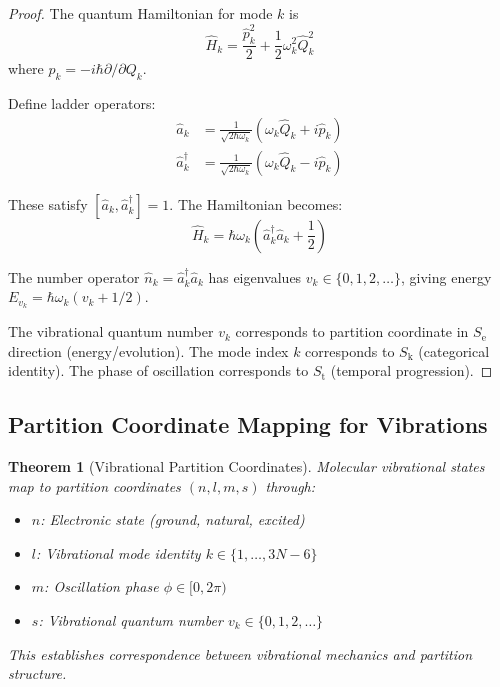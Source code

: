 \documentclass[twocolumn,10pt]{article}
\newtheorem{theorem}{Theorem}[section]
\newcommand{\Sk}{S_{\text{k}}}
\newcommand{\St}{S_{\text{t}}}
\newcommand{\Se}{S_{\text{e}}}
\begin{document}
\begin{proof}
The quantum Hamiltonian for mode $k$ is
\begin{equation}
\hat{H}_k = \frac{\hat{p}_k^2}{2} + \frac{1}{2}\omega_k^2 \hat{Q}_k^2
\end{equation}
where $\hat{p}_k = -i\hbar \partial/\partial Q_k$.

Define ladder operators:
\begin{align}
\hat{a}_k &= \frac{1}{\sqrt{2\hbar\omega_k}}(\omega_k \hat{Q}_k + i\hat{p}_k) \\
\hat{a}_k^\dagger &= \frac{1}{\sqrt{2\hbar\omega_k}}(\omega_k \hat{Q}_k - i\hat{p}_k)
\end{align}

These satisfy $[\hat{a}_k, \hat{a}_k^\dagger] = 1$. The Hamiltonian becomes:
\begin{equation}
\hat{H}_k = \hbar\omega_k\left(\hat{a}_k^\dagger \hat{a}_k + \frac{1}{2}\right)
\end{equation}

The number operator $\hat{n}_k = \hat{a}_k^\dagger \hat{a}_k$ has eigenvalues $v_k \in \{0,1,2,\ldots\}$, giving energy $E_{v_k} = \hbar\omega_k(v_k + 1/2)$.

The vibrational quantum number $v_k$ corresponds to partition coordinate in $\Se$ direction (energy/evolution). The mode index $k$ corresponds to $\Sk$ (categorical identity). The phase of oscillation corresponds to $\St$ (temporal progression).
\end{proof}

\subsection{Partition Coordinate Mapping for Vibrations}

\begin{theorem}[Vibrational Partition Coordinates]
\label{thm:vibrational_partition}
Molecular vibrational states map to partition coordinates $(n, l, m, s)$ through:
\begin{itemize}
\item $n$: Electronic state (ground, natural, excited)
\item $l$: Vibrational mode identity $k \in \{1, \ldots, 3N-6\}$
\item $m$: Oscillation phase $\phi \in [0, 2\pi)$
\item $s$: Vibrational quantum number $v_k \in \{0, 1, 2, \ldots\}$
\end{itemize}
This establishes correspondence between vibrational mechanics and partition structure.
\end{theorem}
\end{document}
